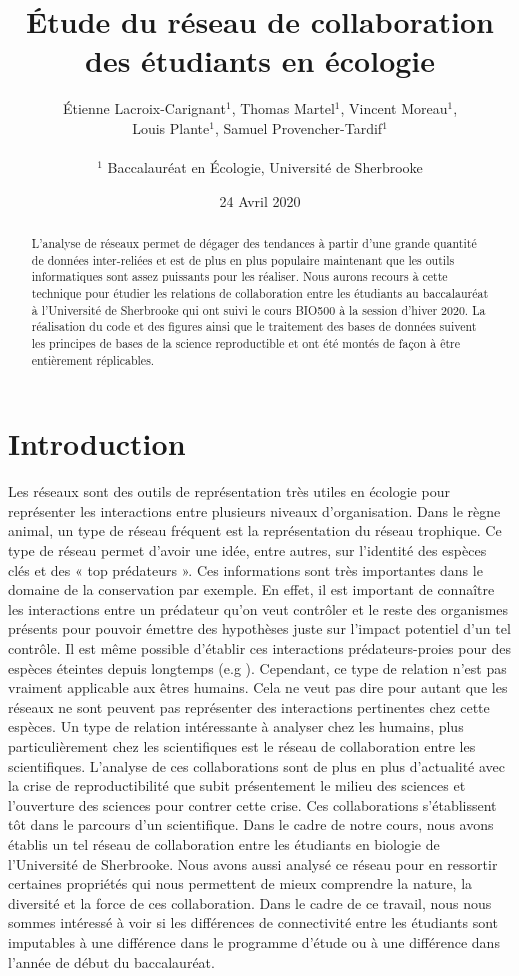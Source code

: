 \documentclass[letterpaper,twocolumn,showkeys, 12pt]{article}
\title{Étude du réseau de collaboration des étudiants en écologie }
\author{Étienne Lacroix-Carignant\(^1\), Thomas Martel\(^1\), Vincent Moreau\(^1\), \\ Louis Plante\(^1\), Samuel Provencher-Tardif\(^1\) \\
\\ \(^1\) Baccalauréat en Écologie, Université de Sherbrooke}
\date{24 Avril 2020}
\begin{document}
\maketitle

\begin{abstract}
    L'analyse de réseaux permet de dégager des tendances à partir d'une grande quantité de données inter-reliées et est de plus en plus populaire maintenant que les outils informatiques sont assez puissants pour les réaliser. Nous aurons recours à cette technique pour étudier les relations de collaboration entre les étudiants au baccalauréat à l'Université de Sherbrooke qui ont suivi le cours BIO500 à la session d'hiver 2020. La réalisation du code et des figures ainsi que le traitement des bases de données suivent les principes de bases de la science reproductible et ont été montés de façon à être entièrement réplicables.
\end{abstract}

\section*{Introduction}
\noindent Les réseaux sont des outils de représentation très utiles en écologie pour représenter les interactions entre plusieurs niveaux d’organisation. Dans le règne animal, un type de réseau fréquent est la représentation du réseau trophique. Ce type de réseau permet d’avoir une idée, entre autres, sur l’identité des espèces clés et des « top prédateurs ». Ces informations sont très importantes dans le domaine de la conservation par exemple. En effet, il est important de connaître les interactions entre un prédateur qu’on veut contrôler et le reste des organismes présents pour pouvoir émettre des hypothèses juste sur l’impact potentiel d’un tel contrôle. Il est même possible d’établir ces interactions prédateurs-proies pour des espèces éteintes depuis longtemps (e.g \cite{chevrinais_early_2017}). Cependant, ce type de relation n’est pas vraiment applicable aux êtres humains. Cela ne veut pas dire pour autant que les réseaux ne sont peuvent pas représenter des interactions pertinentes chez cette espèces. Un type de relation intéressante à analyser chez les humains, plus particulièrement chez les scientifiques est le réseau de collaboration entre les scientifiques. L’analyse de ces collaborations sont de plus en plus d’actualité avec la crise de reproductibilité que subit présentement le milieu des sciences et l’ouverture des sciences pour contrer cette crise. Ces collaborations s’établissent tôt dans le parcours d’un scientifique. Dans le cadre de notre cours, nous avons établis un tel réseau de collaboration entre les étudiants en biologie de l’Université de Sherbrooke. Nous avons aussi analysé ce réseau pour en ressortir certaines propriétés qui nous permettent de mieux comprendre la nature, la diversité et la force de ces collaboration. Dans le cadre de ce travail, nous nous sommes intéressé à voir si les différences de connectivité entre les étudiants sont imputables à une différence dans le programme d'étude ou à une différence dans l'année de début du baccalauréat. 
\end{document}
